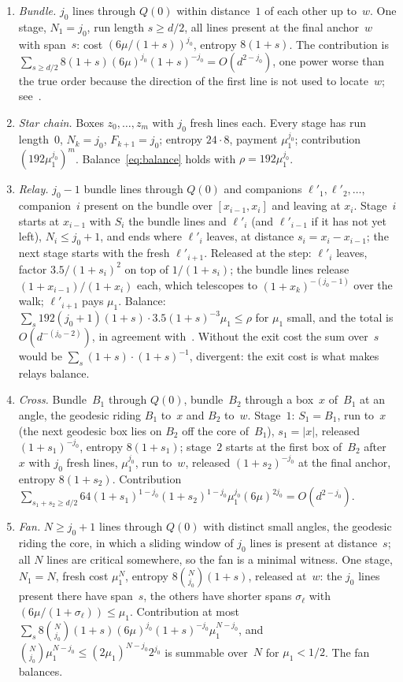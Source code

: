 \documentclass[11pt,letterpaper]{article}
\begin{document}
\begin{enumerate}
  \item \emph{Bundle.} $j_0$ lines through $Q(0)$ within distance~$1$ of each other up to~$w$. One stage, $N_1=j_0$, run length $s\ge d/2$, all lines present at the final anchor~$w$ with span~$s$: cost $(6\mu/(1+s))^{j_0}$, entropy $8(1+s)$. The contribution is $\sum_{s\ge d/2}8(1+s)(6\mu)^{j_0}(1+s)^{-j_0}=O(d^{2-j_0})$, one power worse than the true order because the direction of the first line is not used to locate~$w$; see~\cite[Lemma~6.4]{DEC26}.
  \item \emph{Star chain.} Boxes $z_0,\dots,z_m$ with $j_0$ fresh lines each. Every stage has run length~$0$, $N_k=j_0$, $F_{k+1}=j_0$; entropy $24\cdot8$, payment $\mu_1^{j_0}$; contribution $(192\mu_1^{j_0})^m$. Balance~\eqref{eq:balance} holds with $\rho=192\mu_1^{j_0}$.
  \item \emph{Relay.} $j_0-1$ bundle lines through $Q(0)$ and companions $\ell'_1,\ell'_2,\dots$, companion~$i$ present on the bundle over $[x_{i-1},x_i]$ and leaving at $x_i$. Stage~$i$ starts at $x_{i-1}$ with $S_i$ the bundle lines and $\ell'_i$ (and $\ell'_{i-1}$ if it has not yet left), $N_i\le j_0+1$, and ends where $\ell'_i$ leaves, at distance $s_i=x_i-x_{i-1}$; the next stage starts with the fresh $\ell'_{i+1}$. Released at the step: $\ell'_i$ leaves, factor $3.5/(1+s_i)^2$ on top of $1/(1+s_i)$; the bundle lines release $(1+x_{i-1})/(1+x_i)$ each, which telescopes to $(1+x_k)^{-(j_0-1)}$ over the walk; $\ell'_{i+1}$ pays $\mu_1$. Balance: $\sum_s192(j_0+1)(1+s)\cdot3.5(1+s)^{-3}\mu_1\le\rho$ for $\mu_1$ small, and the total is $O(d^{-(j_0-2)})$, in agreement with~\cite[Lemma~7.3]{DEC26}. Without the exit cost the sum over~$s$ would be $\sum_s(1+s)\cdot(1+s)^{-1}$, divergent: the exit cost is what makes relays balance.
  \item \emph{Cross.} Bundle~$B_1$ through $Q(0)$, bundle~$B_2$ through a box~$x$ of~$B_1$ at an angle, the geodesic riding $B_1$ to~$x$ and $B_2$ to~$w$. Stage~$1$: $S_1=B_1$, run to~$x$ (the next geodesic box lies on $B_2$ off the core of~$B_1$), $s_1=\lvert x\rvert$, released $(1+s_1)^{-j_0}$, entropy $8(1+s_1)$; stage~$2$ starts at the first box of~$B_2$ after~$x$ with $j_0$ fresh lines, $\mu_1^{j_0}$, run to~$w$, released $(1+s_2)^{-j_0}$ at the final anchor, entropy $8(1+s_2)$. Contribution $\sum_{s_1+s_2\ge d/2}64(1+s_1)^{1-j_0}(1+s_2)^{1-j_0}\mu_1^{j_0}(6\mu)^{2j_0}=O(d^{2-j_0})$.
  \item \emph{Fan.} $N\ge j_0+1$ lines through $Q(0)$ with distinct small angles, the geodesic riding the core, in which a sliding window of $j_0$ lines is present at distance~$s$; all $N$ lines are critical somewhere, so the fan is a minimal witness. One stage, $N_1=N$, fresh cost $\mu_1^N$, entropy $8\binom N{j_0}(1+s)$, released at~$w$: the $j_0$ lines present there have span~$s$, the others have shorter spans $\sigma_\ell$ with $(6\mu/(1+\sigma_\ell))\le\mu_1$. Contribution at most $\sum_s8\binom N{j_0}(1+s)(6\mu)^{j_0}(1+s)^{-j_0}\mu_1^{N-j_0}$, and $\binom N{j_0}\mu_1^{N-j_0}\le(2\mu_1)^{N-j_0}2^{j_0}$ is summable over~$N$ for $\mu_1<1/2$. The fan balances.
\end{enumerate}
\end{document}
